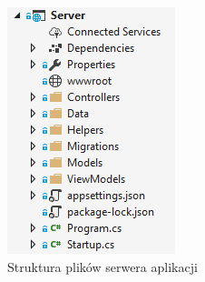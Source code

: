 \begin{figure}
    \includegraphics[width=1\linewidth]{graphics/chapter-4/server-structure.png}
    \caption{Struktura plików serwera aplikacji}
    \label{fig:server-structure}
\end{figure}

